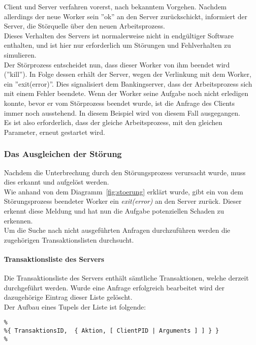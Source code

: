 Client und Server verfahren vorerst, nach bekanntem Vorgehen. Nachdem allerdings der neue Worker sein ''ok'' an den Server zurückschickt, informiert der Server, die Störquelle über den neuen Arbeitsprozess. \\
Dieses Verhalten des Servers ist normalerweise nicht in endgültiger Software enthalten, und ist hier nur erforderlich um Störungen und Fehlverhalten zu simulieren.\\
Der Störprozess entscheidet nun, dass dieser Worker von ihm beendet wird (''kill''). In Folge dessen erhält der Server, wegen der Verlinkung mit dem Worker, ein ''exit(error)''. Dies signalisiert dem Bankingserver, dass der Arbeitsprozess sich mit einem Fehler beendete. Wenn der Worker seine Aufgabe noch nicht erledigen konnte, bevor er vom Störprozess beendet wurde, ist die Anfrage des Clients immer noch ausstehend. In diesem Beispiel wird von diesem Fall ausgegangen.\\
Es ist also erforderlich, dass der gleiche Arbeitsprozess, mit den gleichen Parameter, erneut gestartet wird.

\subsubsection{Das Ausgleichen der Störung}

Nachdem die Unterbrechung durch den Störungsprozess verursacht wurde, muss dies erkannt und aufgelöst werden.\\
Wie anhand von dem Diagramm~\ref{fig:stoerung} erklärt wurde, gibt ein von dem Störungsprozess beendeter Worker ein \textit{exit(error)} an den Server zurück. Dieser erkennt diese Meldung und hat nun die Aufgabe potenziellen Schaden zu erkennen.\\
Um die Suche nach nicht ausgeführten Anfragen durchzuführen werden die zugehörigen Transaktionslisten durchsucht.

\paragraph{Transaktionsliste des Servers}

Die Transaktionsliste des Servers enthält sämtliche Transaktionen, welche derzeit durchgeführt werden. Wurde eine Anfrage erfolgreich bearbeitet wird der dazugehörige Eintrag dieser Liste gelöscht.\\
Der Aufbau eines Tupels der Liste ist folgende:

\begin{lstlisting}
%
%{ TransaktionsID,  { Aktion, [ ClientPID | Arguments ] ] } }
%
\end{lstlisting}

